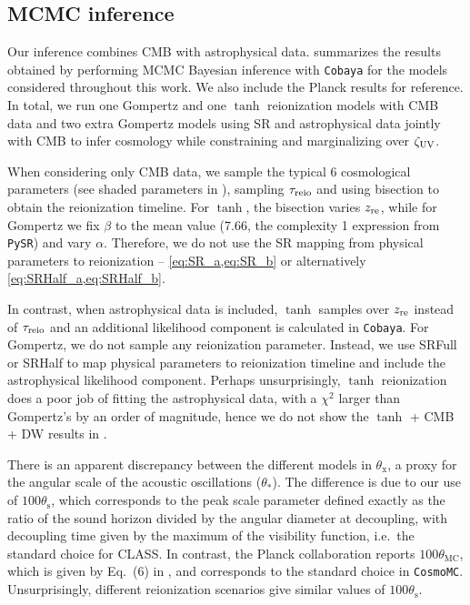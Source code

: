 \subsection*{MCMC inference}
\label{ssec:fits}

Our inference combines CMB with astrophysical data.
 summarizes the results obtained by performing MCMC
Bayesian inference with \texttt{Cobaya} for the models considered
throughout this work.
We also include the Planck results \cite{Planck2020a} for reference.
In total, we run one Gompertz and one $\tanh$ reionization models with
CMB data and two extra Gompertz models using SR and astrophysical data
jointly with CMB to infer cosmology while constraining and
marginalizing over $\zeta_\mathrm{UV}$.

When considering only CMB data, we sample the typical 6 cosmological
parameters (see shaded parameters in ), sampling
$\tau_{\mathrm{reio}}$ and using bisection to obtain the reionization timeline.
For $\tanh$, the bisection varies $z_{\mathrm{re}}$, while for Gompertz we fix
$\beta$ to the mean value (7.66, the complexity 1 expression from
\texttt{PySR}) and vary $\alpha$.
Therefore, we do not use the SR mapping from physical parameters to
reionization -- \cref{eq:SR_a,eq:SR_b} or alternatively
\cref{eq:SRHalf_a,eq:SRHalf_b}.

In contrast, when astrophysical data is included, $\tanh$ samples over
$z_{\mathrm{re}}$ instead of $\tau_{\mathrm{reio}}$ and an additional likelihood component
is calculated in \texttt{Cobaya}.
For Gompertz, we do not sample any reionization parameter.
Instead, we use SRFull or SRHalf to map physical parameters to
reionization timeline and include the astrophysical likelihood
component.
Perhaps unsurprisingly, $\tanh$ reionization does a poor job of fitting
the astrophysical data, with a $\chi^2$ larger than Gompertz's by an
order of magnitude, hence we do not show the $\tanh$ + CMB + DW results
in .

There is an apparent discrepancy between the different models in
$\theta_\mathrm{x}$, a proxy for the angular scale of the acoustic
oscillations ($\theta_*$).
The difference is due to our use of $100\theta_\mathrm{s}$, which
corresponds to the peak scale parameter defined exactly as the ratio of
the sound horizon divided by the angular diameter at decoupling, with
decoupling time given by the maximum of the visibility function, i.e.\
the standard choice for CLASS.
In contrast, the Planck collaboration reports $100\theta_\mathrm{MC}$,
which is given by Eq.~(6) in \cite{Planck2014}, and corresponds to the
standard choice in \texttt{CosmoMC}\cite{Lewis2002}.
Unsurprisingly, different reionization scenarios give similar values of
$100\theta_\mathrm{s}$.

